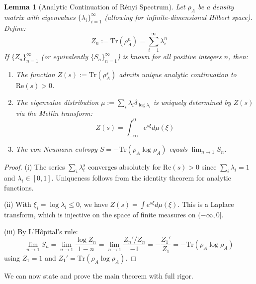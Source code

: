 \documentclass[12pt,a4paper]{article}
\newtheorem{lemma}[theorem]{Lemma}
\begin{document}
\begin{lemma}[Analytic Continuation of R\'enyi Spectrum]\label{lem:analytic-continuation}
Let $\rho_A$ be a density matrix with eigenvalues $\{\lambda_i\}_{i=1}^\infty$ (allowing for infinite-dimensional Hilbert space). Define:
\begin{equation}
Z_n := \text{Tr}(\rho_A^n) = \sum_{i=1}^\infty \lambda_i^n
\end{equation}
If $\{Z_n\}_{n=1}^\infty$ (or equivalently $\{S_n\}_{n=1}^\infty$) is known for all positive integers $n$, then:
\begin{enumerate}
    \item[(i)] The function $Z(s) := \text{Tr}(\rho_A^s)$ admits unique analytic continuation to $\text{Re}(s) > 0$.
    \item[(ii)] The eigenvalue distribution $\mu := \sum_i \lambda_i \delta_{\log\lambda_i}$ is uniquely determined by $Z(s)$ via the Mellin transform:
    \begin{equation}
    Z(s) = \int_{-\infty}^0 e^{s\xi} d\mu(\xi)
    \end{equation}
    \item[(iii)] The von Neumann entropy $S = -\text{Tr}(\rho_A \log \rho_A)$ equals $\lim_{n \to 1} S_n$.
\end{enumerate}
\end{lemma}

\begin{proof}
(i) The series $\sum_i \lambda_i^s$ converges absolutely for $\text{Re}(s) > 0$ since $\sum_i \lambda_i = 1$ and $\lambda_i \in [0,1]$. Uniqueness follows from the identity theorem for analytic functions.

(ii) With $\xi_i = \log\lambda_i \leq 0$, we have $Z(s) = \int e^{s\xi} d\mu(\xi)$. This is a Laplace transform, which is injective on the space of finite measures on $(-\infty, 0]$.

(iii) By L'H\^opital's rule:
\begin{equation}
\lim_{n \to 1} S_n = \lim_{n \to 1} \frac{\log Z_n}{1-n} = \lim_{n \to 1} \frac{Z_n'/Z_n}{-1} = -\frac{Z_1'}{Z_1} = -\text{Tr}(\rho_A \log \rho_A)
\end{equation}
using $Z_1 = 1$ and $Z_1' = \text{Tr}(\rho_A \log \rho_A)$.
\end{proof}

We can now state and prove the main theorem with full rigor.
\end{document}
